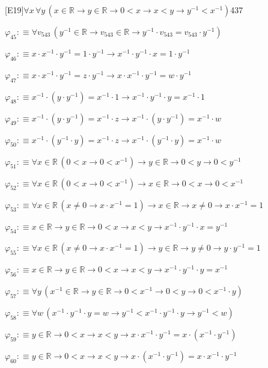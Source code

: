 \begin{fullproof}{[E19]}{$\forall x\,\forall y\,(x \in \mathbb{R} \to y \in \mathbb{R} \to 0 < x \to x < y \to y^{-1} < x^{-1})$}{437}
\begin{abbrevlist}
\item $\varphi_{45} :\equiv \forall v_{543}\,(y^{-1} \in \mathbb{R} \to v_{543} \in \mathbb{R} \to y^{-1} \cdot v_{543} = v_{543} \cdot y^{-1})$
\item $\varphi_{46} :\equiv x \cdot x^{-1} \cdot y^{-1} = 1 \cdot y^{-1} \to x^{-1} \cdot y^{-1} \cdot x = 1 \cdot y^{-1}$
\item $\varphi_{47} :\equiv x \cdot x^{-1} \cdot y^{-1} = z \cdot y^{-1} \to x \cdot x^{-1} \cdot y^{-1} = w \cdot y^{-1}$
\item $\varphi_{48} :\equiv x^{-1} \cdot (y \cdot y^{-1}) = x^{-1} \cdot 1 \to x^{-1} \cdot y^{-1} \cdot y = x^{-1} \cdot 1$
\item $\varphi_{49} :\equiv x^{-1} \cdot (y \cdot y^{-1}) = x^{-1} \cdot z \to x^{-1} \cdot (y \cdot y^{-1}) = x^{-1} \cdot w$
\item $\varphi_{50} :\equiv x^{-1} \cdot (y^{-1} \cdot y) = x^{-1} \cdot z \to x^{-1} \cdot (y^{-1} \cdot y) = x^{-1} \cdot w$
\item $\varphi_{51} :\equiv \forall x \in \mathbb{R}\,(0 < x \to 0 < x^{-1}) \to y \in \mathbb{R} \to 0 < y \to 0 < y^{-1}$
\item $\varphi_{52} :\equiv \forall x \in \mathbb{R}\,(0 < x \to 0 < x^{-1}) \to x \in \mathbb{R} \to 0 < x \to 0 < x^{-1}$
\item $\varphi_{53} :\equiv \forall x \in \mathbb{R}\,(x \neq 0 \to x \cdot x^{-1} = 1) \to x \in \mathbb{R} \to x \neq 0 \to x \cdot x^{-1} = 1$
\item $\varphi_{54} :\equiv x \in \mathbb{R} \to y \in \mathbb{R} \to 0 < x \to x < y \to x^{-1} \cdot y^{-1} \cdot x = y^{-1}$
\item $\varphi_{55} :\equiv \forall x \in \mathbb{R}\,(x \neq 0 \to x \cdot x^{-1} = 1) \to y \in \mathbb{R} \to y \neq 0 \to y \cdot y^{-1} = 1$
\item $\varphi_{56} :\equiv x \in \mathbb{R} \to y \in \mathbb{R} \to 0 < x \to x < y \to x^{-1} \cdot y^{-1} \cdot y = x^{-1}$
\item $\varphi_{57} :\equiv \forall y\,(x^{-1} \in \mathbb{R} \to y \in \mathbb{R} \to 0 < x^{-1} \to 0 < y \to 0 < x^{-1} \cdot y)$
\item $\varphi_{58} :\equiv \forall w\,(x^{-1} \cdot y^{-1} \cdot y = w \to y^{-1} < x^{-1} \cdot y^{-1} \cdot y \to y^{-1} < w)$
\item $\varphi_{59} :\equiv y \in \mathbb{R} \to 0 < x \to x < y \to x \cdot x^{-1} \cdot y^{-1} = x \cdot (x^{-1} \cdot y^{-1})$
\item $\varphi_{60} :\equiv y \in \mathbb{R} \to 0 < x \to x < y \to x \cdot (x^{-1} \cdot y^{-1}) = x \cdot x^{-1} \cdot y^{-1}$

\end{abbrevlist}
\end{fullproof}
